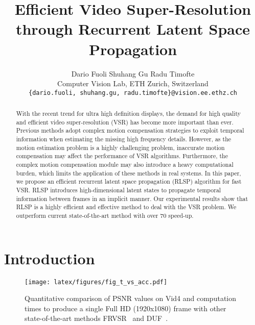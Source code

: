 \documentclass[10pt,twocolumn,letterpaper]{article}
\begin{document}
\title{Efficient Video Super-Resolution through Recurrent Latent Space Propagation}

\author{Dario Fuoli \hspace{2cm} Shuhang Gu \hspace{2cm} Radu Timofte \\
Computer Vision Lab, ETH Zurich, Switzerland\\
{\tt\small \{dario.fuoli, shuhang.gu, radu.timofte\}@vision.ee.ethz.ch}
}


\maketitle
\ifwacvfinal\thispagestyle{empty}\fi

\begin{abstract}

With the recent trend for ultra high definition displays, the demand for high quality and efficient video super-resolution (VSR) has become more important than ever.
Previous methods adopt complex motion compensation strategies to exploit temporal information when estimating the missing high frequency details.
However, as the motion estimation problem is a highly challenging problem, inaccurate motion compensation may affect the performance of VSR algorithms.
Furthermore, the complex motion compensation module may also introduce a heavy computational burden, which limits the application of these methods in real systems. 
In this paper, we propose an efficient recurrent latent space propagation (RLSP) algorithm for fast VSR.
RLSP introduces high-dimensional latent states to propagate temporal information between frames in an implicit manner.
Our experimental results show that RLSP is a highly efficient and effective method to deal with the VSR problem.
We outperform current state-of-the-art method \cite{duf} with over 70 speed-up.




\end{abstract}



\section{Introduction}
\begin{figure}
\begin{center}
\texttt{[image: latex/figures/fig\_t\_vs\_acc.pdf]}
\end{center}
   \caption{Quantitative comparison of PSNR values on Vid4 and computation times to produce a single Full HD (1920x1080) frame with other state-of-the-art methods FRVSR~\cite{frvsr} and DUF~\cite{duf}.}
\label{fig:t_vs_acc}
\end{figure}
\end{document}
